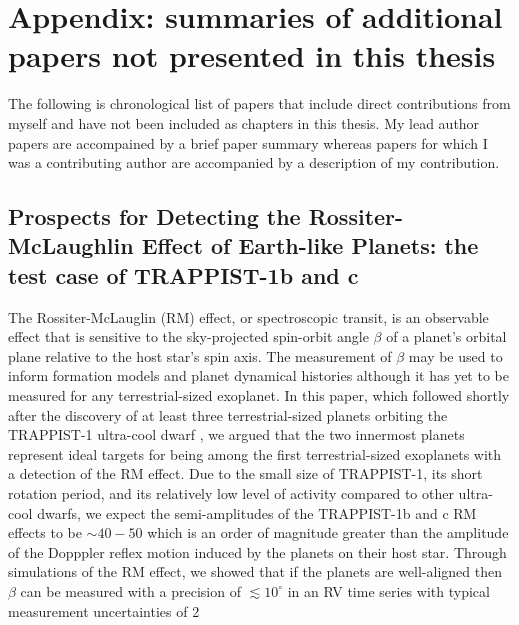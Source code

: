 \chapter[Appendix]{Appendix: summaries of additional papers not presented
  in this thesis}

The following is chronological list of papers
that include direct contributions from myself and have not been included as
chapters in this thesis. My lead author papers are accompained by a brief paper
summary whereas papers for which I was a contributing author are accompanied by
a description of my contribution.

\section{Prospects for Detecting the Rossiter-McLaughlin Effect of
  Earth-like Planets: the test case of TRAPPIST-1b and c \citep{cloutier16a}}
The Rossiter-McLauglin (RM) effect, or spectroscopic transit, is an observable
effect that is sensitive to the sky-projected spin-orbit angle $\beta$ of a
planet's orbital plane relative to the host star's spin axis.
The measurement of $\beta$ may
be used to inform formation models and planet dynamical histories although it
has yet to be measured for any terrestrial-sized exoplanet. 
In this paper, which followed shortly after the discovery of at least three
terrestrial-sized planets orbiting the TRAPPIST-1 ultra-cool dwarf
\citep{gillon16}, we
argued that the two innermost planets represent ideal targets for being among
the first terrestrial-sized exoplanets with a detection of the RM effect.
Due to the small size of TRAPPIST-1, its short rotation period, and its
relatively low level of activity compared to other ultra-cool dwarfs, we expect
the semi-amplitudes of the TRAPPIST-1b and c RM effects to be $\sim 40-50$
\mps{} which is an order of magnitude greater than the amplitude of the
Dopppler reflex motion induced by the planets on their host star.
Through simulations of the RM effect, we showed that if the planets are
well-aligned then $\beta$ can be measured with a precision of
$\lesssim 10^{\circ}$ in an RV time series with typical measurement
uncertainties of 2 


